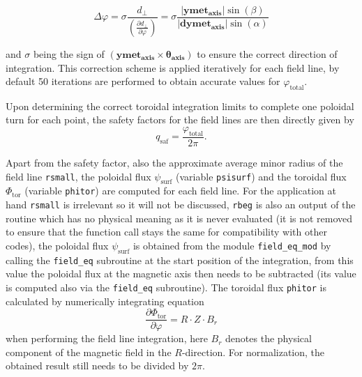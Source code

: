 \documentclass[./main.tex]{subfiles}
\begin{document}
\begin{equation*}
\Delta\varphi=\sigma\frac{d_\perp}{\left(\frac{\partial d_\perp}{\partial \varphi}\right)} = \sigma\frac{|\bm{ymet_\text{axis}}|\sin(\beta)}{|\bm{dymet_\text{axis}}|\sin(\alpha)}
\end{equation*}

and $\sigma$ being the sign of $(\bm{ymet_\text{axis}} \times \bm{\theta_\text{axis}})$ to ensure the correct direction of integration. This correction scheme is applied iteratively for each field line, by default 50 iterations are performed to obtain accurate values for $\varphi_\text{total}$.

Upon determining the correct toroidal integration limits to complete one poloidal turn for each point, the safety factors for the field lines are then directly given by
\begin{equation*}
q_\text{saf} = \frac{\varphi_\text{total}}{2\pi}.
\end{equation*}

Apart from the safety factor, also the approximate average minor radius of the field line \texttt{rsmall}, the poloidal flux $\psi_\text{surf}$ (variable \texttt{psisurf}) and the toroidal flux $\Phi_\text{tor}$ (variable \texttt{phitor}) are computed for each field line. For the application at hand \texttt{rsmall} is irrelevant so it will not be discussed, \texttt{rbeg} is also an output of the routine which has no physical meaning as it is never evaluated (it is not removed to ensure that the function call stays the same for compatibility with other codes), the poloidal flux $\psi_\text{surf}$ is obtained from the module \texttt{field\_eq\_mod} by calling the \texttt{field\_eq} subroutine at the start position of the integration, from this value the poloidal flux at the magnetic axis then needs to be subtracted (its value is computed also via the \texttt{field\_eq} subroutine). The toroidal flux \texttt{phitor} is calculated by numerically integrating equation 
\begin{equation*}
\frac{\partial \Phi_\text{tor}}{\partial \varphi} = R\cdot Z\cdot B_r  
\end{equation*}
when performing the field line integration, here $B_r$ denotes the physical component of the magnetic field in the $R$-direction. For normalization, the obtained result still needs to be divided by $2\pi$. 
\end{document}

